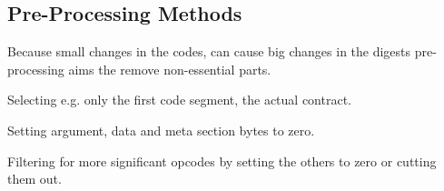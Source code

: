 \documentclass[../main.tex]{subfiles}
\begin{document}
\subsection{Pre-Processing Methods}
Because small changes in the codes, can cause big changes in the digests pre-processing aims the remove non-essential parts.

\begin{description}[style=unboxed]
  \item[Segment Selection] Selecting e.g. only the first code segment, the actual contract.
  \item[Skeletonization] Setting argument, data and meta section bytes to zero.
  \item[Opcode filteringn] Filtering for more significant opcodes by setting the others to zero or cutting them out.
\end{description}
\end{document}
